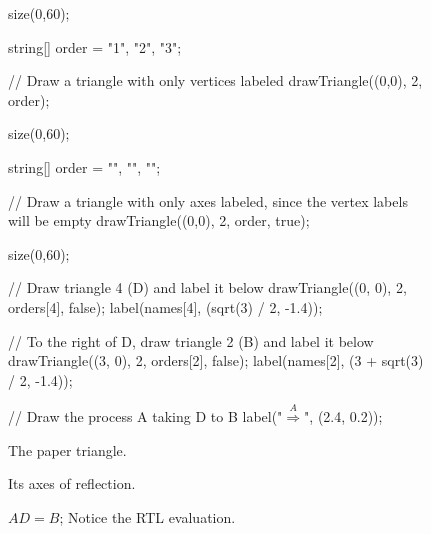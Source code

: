 \documentclass[../textbook.tex]{subfiles}
\begin{document}
\begin{figure}[h]
	\begin{center}
		\begin{minipage}[b]{0.3\textwidth}
			\centering
			\begin{asy}[width=0.4\textwidth]
				size(0,60);

				string[] order = {"1", "2", "3"};

				// Draw a triangle with only vertices labeled
				drawTriangle((0,0), 2, order);
			\end{asy}
		\end{minipage}
		\hfill
		\begin{minipage}[b]{0.3\textwidth}
			\centering
			\begin{asy}[width=0.5\textwidth]
				size(0,60);

				string[] order = {"", "", ""};

				// Draw a triangle with only axes labeled, since the vertex labels will be empty
				drawTriangle((0,0), 2, order, true);
			\end{asy}
		\end{minipage}
		\hfill
		\begin{minipage}[b]{0.3\textwidth}
			\centering
			\begin{asy}[width=0.9\textwidth]
				size(0,60);

				// Draw triangle 4 (D) and label it below
				drawTriangle((0, 0), 2, orders[4], false);
				label(names[4], (sqrt(3) / 2, -1.4));

				// To the right of D, draw triangle 2 (B) and label it below
				drawTriangle((3, 0), 2, orders[2], false);
				label(names[2], (3 + sqrt(3) / 2, -1.4));

				// Draw the process A taking D to B
				label("$\stackrel{A}{\Longrightarrow}$", (2.4, 0.2));
			\end{asy}
		\end{minipage}
	\end{center}
	\vspace*{-2\baselineskip}
	\begin{center}
		\begin{minipage}[t]{0.3\textwidth}
			\caption{The paper triangle.}
			\label{fig:paper_triangle_sf}
		\end{minipage}
		\hfill
		\begin{minipage}[t]{0.3\textwidth}
			\caption{Its axes of reflection.}
			\label{fig:triangle_reflections_sf}
		\end{minipage}
		\hfill
		\begin{minipage}[t]{0.3\textwidth}
			\caption{$AD = B$; Notice the RTL evaluation.}
			\label{fig:aid_is_b}
		\end{minipage}
	\end{center}


\end{figure}
\end{document}
